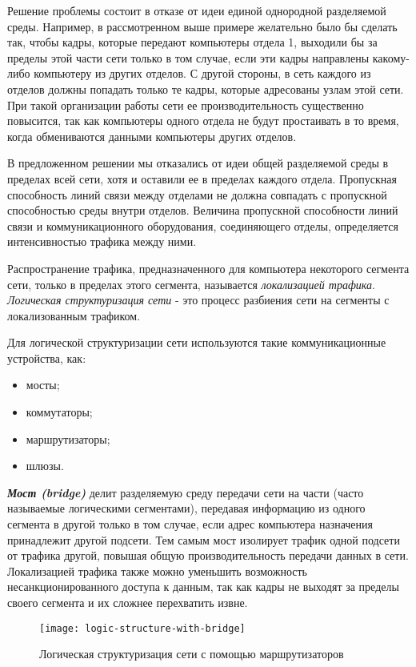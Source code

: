 Решение проблемы состоит в отказе от идеи единой однородной разделяемой среды.
Например, в рассмотренном выше примере желательно было бы сделать так, чтобы кадры, которые передают компьютеры отдела 1, выходили бы за пределы этой части сети только в том случае, если эти кадры направлены какому-либо компьютеру из других отделов.
С другой стороны, в сеть каждого из отделов должны попадать только те кадры, которые адресованы узлам этой сети.
При такой организации работы сети ее производительность существенно повысится, так как компьютеры одного отдела не будут простаивать в то время, когда обмениваются данными компьютеры других отделов.

В предложенном решении мы отказались от идеи общей разделяемой среды в пределах всей сети, хотя и оставили ее в пределах каждого отдела.
Пропускная способность линий связи между отделами не должна совпадать с пропускной способностью среды внутри отделов.
Величина пропускной способности линий связи и коммуникационного оборудования, соединяющего отделы, определяется интенсивностью трафика между ними.

Распространение трафика, предназначенного для компьютера некоторого сегмента сети, только в пределах этого сегмента, называется \emph{локализацией трафика}.
\emph{Логическая структуризация сети} - это процесс разбиения сети на сегменты с локализованным трафиком.

Для логической структуризации сети используются такие коммуникационные устройства, как:
\begin{itemize}
    \item мосты;
    \item коммутаторы;
    \item маршрутизаторы;
    \item шлюзы.
\end{itemize}

\textbf{\textit{Мост (bridge)}} делит разделяемую среду передачи сети на части (часто называемые логическими сегментами), передавая информацию из одного сегмента в другой только в том случае, если адрес компьютера назначения принадлежит другой подсети.
Тем самым мост изолирует трафик одной подсети от трафика другой, повышая общую производительность передачи данных в сети.
Локализацией трафика также можно уменьшить возможность несанкционированного доступа к данным, так как кадры не выходят за пределы своего сегмента и их сложнее перехватить извне.

\begin{figure}[!ht]
    \centering
    \texttt{[image: logic-structure-with-bridge]}
    \caption{Логическая структуризация сети с помощью маршрутизаторов}
    \label{fig:logic-structure-with-bridge}
\end{figure}

